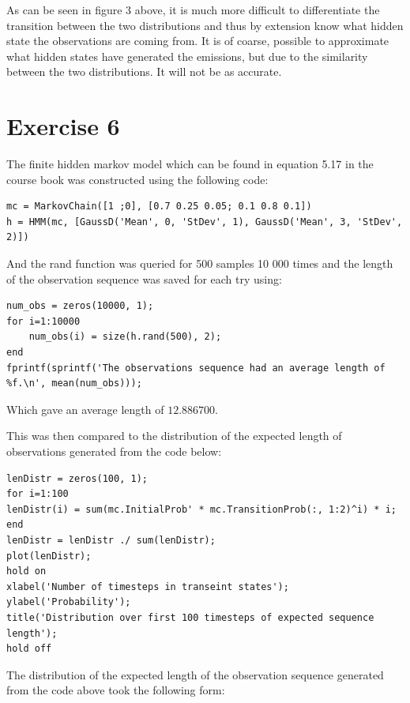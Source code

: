 \documentclass[]{article}
\begin{document}
As can be seen in figure 3 above, it is much more difficult to
differentiate the transition between the two distributions and thus by
extension know what hidden state the observations are coming from. It is
of coarse, possible to approximate what hidden states have generated the
emissions, but due to the similarity between the two distributions. It
will not be as accurate.

\newpage

\hypertarget{exercise-6}{%
\section{Exercise 6}\label{exercise-6}}

The finite hidden markov model which can be found in equation 5.17 in
the course book was constructed using the following code:

\begin{verbatim}
mc = MarkovChain([1 ;0], [0.7 0.25 0.05; 0.1 0.8 0.1])
h = HMM(mc, [GaussD('Mean', 0, 'StDev', 1), GaussD('Mean', 3, 'StDev', 2)])
\end{verbatim}

And the rand function was queried for 500 samples 10 000 times and the
length of the observation sequence was saved for each try using:

\begin{verbatim}
num_obs = zeros(10000, 1);
for i=1:10000
    num_obs(i) = size(h.rand(500), 2);
end
fprintf(sprintf('The observations sequence had an average length of %f.\n', mean(num_obs)));
\end{verbatim}

Which gave an average length of \(12.886700\).

This was then compared to the distribution of the expected length of
observations generated from the code below:

\begin{verbatim}
lenDistr = zeros(100, 1);
for i=1:100
lenDistr(i) = sum(mc.InitialProb' * mc.TransitionProb(:, 1:2)^i) * i;
end
lenDistr = lenDistr ./ sum(lenDistr);
plot(lenDistr);
hold on
xlabel('Number of timesteps in transeint states');
ylabel('Probability');
title('Distribution over first 100 timesteps of expected sequence length');
hold off
\end{verbatim}

The distribution of the expected length of the observation sequence
generated from the code above took the following form:
\end{document}
